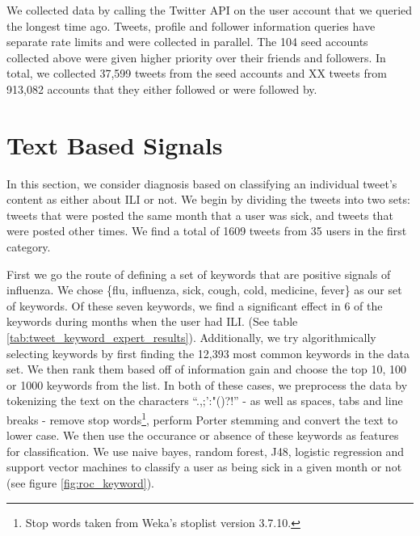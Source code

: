 \documentclass{acm_proc_article-sp}
\begin{document}
We collected data by calling the Twitter API on the user account that we queried the longest time ago. Tweets, profile and follower information queries have separate rate limits and were collected in parallel. The 104 seed accounts collected above were given higher priority over their friends and followers. In total, we collected 37,599 tweets from the seed accounts and XX tweets from 913,082 accounts that they either followed or were followed by.


\section{Text Based Signals}

In this section, we consider diagnosis based on classifying an individual tweet's content as either about ILI or not. We begin by dividing the tweets into two sets: tweets that were posted the same month that a user was sick, and tweets that were posted other times. We find a total of 1609 tweets from 35 users in the first category.

First we go the route of defining a set of keywords that are positive signals of influenza. We chose \{flu, influenza, sick, cough, cold, medicine, fever\} as our set of keywords. Of these seven keywords, we find a significant effect in 6 of the keywords during months when the user had ILI. (See table \ref{tab:tweet_keyword_expert_results}). Additionally, we try algorithmically selecting keywords by first finding the 12,393 most common keywords in the data set.  We then rank them based off of information gain and choose the top 10, 100 or 1000 keywords from the list. In both of these cases, we preprocess the data by tokenizing the text on the characters ``.,;':"()?!'' - as well as spaces, tabs and line breaks - remove stop words\footnote{Stop words taken from Weka's stoplist version 3.7.10.}, perform Porter stemming \cite{Porter:1980dd,Willett:2006vb}  and convert the text to lower case. We then use the occurance or absence of these keywords as features for classification. We use naive bayes, random forest, J48, logistic regression and support vector machines to classify a user as being sick in a given month or not (see figure \ref{fig:roc_keyword}).
\end{document}
